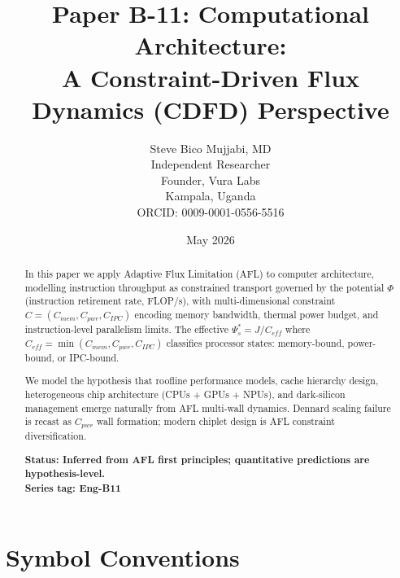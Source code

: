 \documentclass[11pt]{article}
\title{\textbf{Paper B-11: Computational Architecture:\\ A Constraint-Driven Flux Dynamics (CDFD) Perspective}}
\author{Steve Bico Mujjabi, MD\\
\small Independent Researcher\\
\small Founder, Vura Labs\\
\small Kampala, Uganda\\
\small ORCID: 0009-0001-0556-5516}
\date{May 2026}
\begin{document}
\maketitle
\newpage


\begin{abstract}
In this paper we apply Adaptive Flux Limitation (AFL) to computer architecture, modelling
instruction throughput as constrained transport governed by the potential $\Phi$ (instruction
retirement rate, FLOP/s), with multi-dimensional constraint $C = (C_{mem}, C_{pwr}, C_{IPC})$
encoding memory bandwidth, thermal power budget, and instruction-level parallelism limits.
The effective $\Psi_s^* = J/C_{eff}$ where $C_{eff} = \min(C_{mem}, C_{pwr}, C_{IPC})$ classifies
processor states: memory-bound, power-bound, or IPC-bound.

We model the hypothesis that roofline performance models, cache hierarchy design, heterogeneous chip
architecture (CPUs + GPUs + NPUs), and dark-silicon management emerge naturally from AFL
multi-wall dynamics. Dennard scaling failure is recast as $C_{pwr}$ wall formation; modern
chiplet design is AFL constraint diversification.

\textbf{Status: Inferred from AFL first principles; quantitative predictions are hypothesis-level.}\\
\textbf{Series tag: Eng-B11}
\end{abstract}

\section*{Symbol Conventions}
\end{document}
